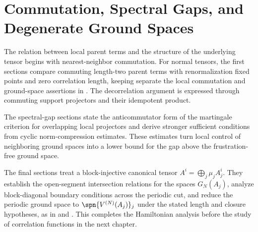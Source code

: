 \chapter{Commutation, Spectral Gaps, and Degenerate Ground Spaces}
\label{ch:parent_hamiltonian_gap_and_blocks}

The relation between local parent terms and the structure of the underlying
tensor begins with nearest-neighbor commutation. For normal tensors, the first
sections compare commuting length-two parent terms with renormalization fixed
points and zero correlation length, keeping separate the local commutation and
ground-space assertions in \cite{Cirac2016MPDO_arXiv}. The decorrelation
argument is expressed through commuting support projectors and their
idempotent product.

The spectral-gap sections state the anticommutator form of the martingale
criterion for overlapping local projectors and derive stronger sufficient
conditions from cyclic norm-compression estimates. These estimates turn local
control of neighboring ground spaces into a lower bound for the gap above the
frustration-free ground space.

The final sections treat a block-injective canonical tensor
$A^i=\bigoplus_j\mu_jA_j^i$. They establish the open-segment intersection
relations for the spaces $G_N(A_j)$, analyze block-diagonal boundary conditions
across the periodic cut, and reduce the periodic ground space to
$\spn\{V^{(N)}(A_j)\}_j$ under the stated length and closure hypotheses, as in
\cite[Theorem~IV.16]{Cirac2021Matrix} and
\cite[Theorem~12]{PerezGarcia2007Matrix}. This completes the Hamiltonian
analysis before the study of correlation functions in the next chapter.











